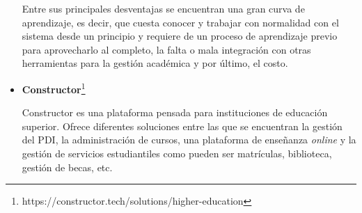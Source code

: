 \begin{itemize}
Entre sus principales desventajas se encuentran una gran curva de aprendizaje, es decir, que cuesta conocer y trabajar con normalidad con el sistema desde un principio y requiere de un proceso de aprendizaje previo para aprovecharlo al completo, la falta o mala integración con otras herramientas para la gestión académica y por último, el costo.

\item \textbf{Constructor}\footnote{https://constructor.tech/solutions/higher-education}

Constructor es una plataforma pensada para instituciones de educación superior.
Ofrece diferentes soluciones entre las que se encuentran la gestión del PDI, la administración de cursos, una plataforma de enseñanza \textit{online} y la gestión de servicios estudiantiles como pueden ser matrículas, biblioteca, gestión de becas, etc.


\end{itemize}
